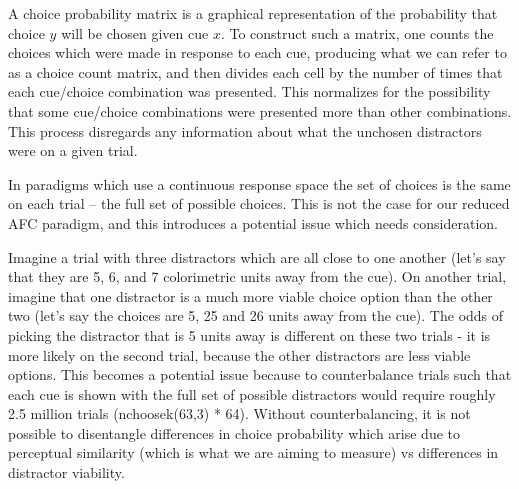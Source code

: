\documentclass[9pt,biorxiv,lineno,onehalfspacing]{lapreprint}
\begin{document}
\begin{refsection}
A choice probability matrix is a graphical representation of the probability that choice $y$ will be chosen given cue $x$.
To construct such a matrix, one counts the choices which were made in response to each cue, producing what we can refer to as a choice count matrix, and then divides each cell by the number of times that each cue/choice combination was presented. 
This normalizes for the possibility that some cue/choice combinations were presented more than other combinations. 
This process disregards any information about what the unchosen distractors were on a given trial.

In paradigms which use a continuous response space the set of choices is the same on each trial – the full set of possible choices. 
This is not the case for our reduced AFC paradigm, and this introduces a potential issue which needs consideration.

Imagine a trial with three distractors which are all close to one another (let's say that they are 5, 6, and 7 colorimetric units away from the cue).
On another trial, imagine that one distractor is a much more viable choice option than the other two (let's say the choices are 5, 25 and 26 units away from the cue).
The odds of picking the distractor that is 5 units away is different on these two trials - it is more likely on the second trial, because the other distractors are less viable options. 
This becomes a potential issue because to counterbalance trials such that each cue is shown with the full set of possible distractors would require roughly 2.5 million trials (nchoosek(63,3) * 64).
Without counterbalancing, it is not possible to disentangle differences in choice probability which arise due to perceptual similarity (which is what we are aiming to measure) vs differences in distractor viability.


\end{refsection}
\end{document}
